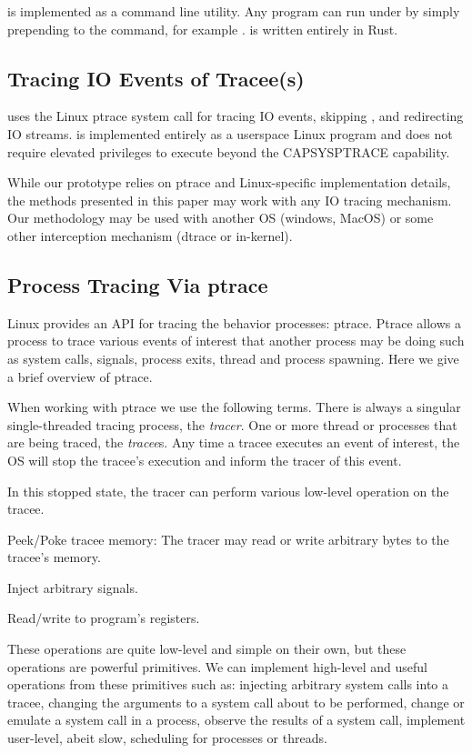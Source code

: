 \pc is implemented as a command line utility. Any program can run under \pc by simply prepending \pc to the command, for example . \pc is written entirely in Rust. %

\subsection{Tracing IO Events of Tracee(s)}
\pc uses the Linux ptrace system call for tracing IO events, skipping \cacheunit, and redirecting IO streams. \pc is implemented entirely as a userspace Linux program and does not require elevated privileges to execute beyond the CAP\textunderscore SYS\textunderscore PTRACE capability.

While our prototype relies on ptrace and Linux-specific implementation details, the methods presented in this paper may work with any IO tracing mechanism. Our methodology may be used with another OS (windows, MacOS) or some other interception mechanism (dtrace or in-kernel).

\subsection{Process Tracing Via ptrace}
Linux provides an API for tracing the behavior processes: ptrace. Ptrace allows a process to trace various
events of interest that another process may be doing such as system calls, signals, process exits,
thread and process spawning. Here we give a brief overview of ptrace.

When working with ptrace we use the following terms. There is always a singular single-threaded tracing process, the \textit{tracer}. One or more thread or processes that are being traced, the \textit{tracee}s. Any time a tracee executes an event of interest, the OS will stop the tracee's execution and inform the tracer of this event.

In this stopped state, the tracer can perform various low-level operation on the tracee.
\begin{compactitem}
  \item Peek/Poke tracee memory: The tracer may read or write arbitrary bytes to the tracee's memory.
  \item Inject arbitrary signals.
  \item Read/write to program's registers.
\end{compactitem}

These operations are quite low-level and simple on their own, but these operations are powerful
primitives. We can implement high-level and useful operations from these primitives such as:
injecting arbitrary system calls into a tracee, changing the arguments to a system call about to
be performed, change or emulate a system call in a process, observe the results of a system call,
implement user-level, abeit slow, scheduling for processes or threads.

